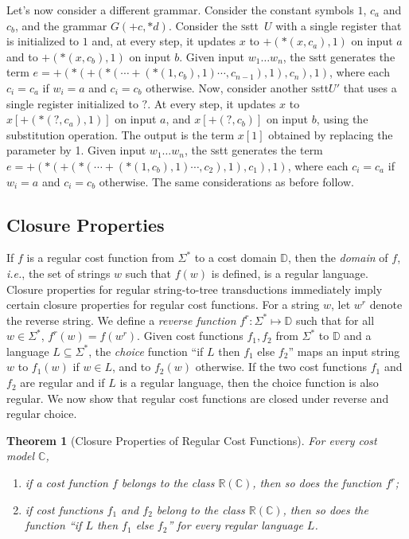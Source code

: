 \documentclass[11pt]{article}
\newtheorem{theorem}{Theorem}
\newcommand{\mypar}[1]{\subsection{#1}}
\newcommand{\domain}{\ensuremath{\mathbb{D}}}
\def\hole{?}
\newcommand{\CG}{G}
\newcommand{\reg}[1]{{\mathbb R}(#1)}
\newcommand{\CostModel}{\ensuremath{\mathbb{C}}}
\newcommand{\SSTT}{{\sc\textsc sstt}\xspace}
\newcommand{\stt}{\ensuremath{U}}
\newcommand{\fm}[1]{\ensuremath{#1^{*}}}
\newcommand{\ie}{{\em i.e.}\xspace}
\begin{document}
Let's now consider a different grammar. Consider the constant symbols
$1$, $c_a$ and $c_b$, and the grammar $\CG(+c,*d)$.
Consider the \SSTT~$\stt$ with a single register that is initialized
to $1$ and, at every step, it updates $x$ to $+(*(x,c_a),1)$ on input $a$
and to $+(*(x,c_b),1)$ on input $b$.
Given input $w_1\ldots w_n$, the \SSTT
generates the term
$e=+(*(+(*(\cdots +(*(1,c_b),1) \cdots,c_{n-1}),1),c_n),1)$, where each
$c_i=c_a$ if $w_i=a$ and $c_i=c_b$ otherwise.
Now, consider another
\SSTT $\stt'$ that uses a single register initialized to $\hole$.
At every step, it updates $x$ to $x[+(*(\hole,c_a),1)]$ on input $a$, and
$x[+(\hole,c_b)]$ on input $b$, using the substitution operation.  The
output is the term $x[1]$ obtained by replacing the parameter by 1.
Given input $w_1\ldots w_n$, the \SSTT
generates the term
$e=+(*(+(*(\cdots +(*(1,c_b),1) \cdots,c_{2}),1),c_1),1)$, where each
$c_i=c_a$ if $w_i=a$ and $c_i=c_b$ otherwise. The same considerations as before follow.


\mypar{Closure Properties}
If $f$ is a regular cost function from $\fm{\Sigma}$ to a cost domain
$\domain$, then the {\em domain} of $f$, \ie, the set of strings $w$
such that $f(w)$ is defined, is a regular language. Closure properties
for regular string-to-tree transductions immediately imply certain
closure properties for regular cost functions.  For a string $w$, let
$w^{r}$ denote the reverse string.  We define a {\em reverse function}
$f^{r}:\fm{\Sigma} \mapsto \domain$ such that for all $w \in
\fm{\Sigma}$, $f^{r}(w) = f(w^r)$.
Given cost functions $f_1,f_2$ from $\fm{\Sigma}$ to $\domain$ and a
language $L\subseteq \fm\Sigma$, the {\em choice\/} function ``if $L$
then $f_1$ else $f_2$'' maps an input string $w$ to $f_1(w)$ if $w\in
L$, and to $f_2(w)$ otherwise.  If the two cost functions $f_1$ and
$f_2$ are regular and if $L$ is a regular language, then the choice
function is also regular. We now show that regular cost functions are
closed under reverse and regular choice.

\begin{theorem}[Closure Properties of Regular Cost Functions]
For every cost model $\CostModel$,
\begin{enumerate}
\item[(a)]
if a cost function $f$ belongs to the class $\reg{\CostModel}$, then
so does the function $f^r$;
\item[(b)]
if cost functions $f_1$ and $f_2$ belong to the class $\reg{\CostModel}$,
then so does the function ``if $L$ then $f_1$ else $f_2$'' for every regular language $L$.
\end{enumerate}
\end{theorem}
\end{document}
